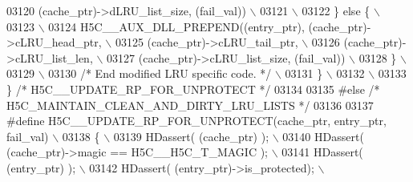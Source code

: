 \begin{DoxyCode}
03120 \textcolor{preprocessor}{                                 (cache\_ptr)->dLRU\_list\_size, (fail\_val))  \(\backslash\)}
03121 \textcolor{preprocessor}{                                                                           \(\backslash\)}
03122 \textcolor{preprocessor}{        \} else \{                                                           \(\backslash\)}
03123 \textcolor{preprocessor}{                                                                           \(\backslash\)}
03124 \textcolor{preprocessor}{            H5C\_\_AUX\_DLL\_PREPEND((entry\_ptr), (cache\_ptr)->cLRU\_head\_ptr,  \(\backslash\)}
03125 \textcolor{preprocessor}{                                 (cache\_ptr)->cLRU\_tail\_ptr,               \(\backslash\)}
03126 \textcolor{preprocessor}{                                 (cache\_ptr)->cLRU\_list\_len,               \(\backslash\)}
03127 \textcolor{preprocessor}{                                 (cache\_ptr)->cLRU\_list\_size, (fail\_val))  \(\backslash\)}
03128 \textcolor{preprocessor}{        \}                                                                  \(\backslash\)}
03129 \textcolor{preprocessor}{                                                                           \(\backslash\)}
03130 \textcolor{preprocessor}{        }\textcolor{comment}{/* End modified LRU specific code. */}\textcolor{preprocessor}{                              \(\backslash\)}
03131 \textcolor{preprocessor}{    \}                                                                      \(\backslash\)}
03132 \textcolor{preprocessor}{                                                                           \(\backslash\)}
03133 \textcolor{preprocessor}{\} }\textcolor{comment}{/* H5C\_\_UPDATE\_RP\_FOR\_UNPROTECT */}\textcolor{preprocessor}{}
03134 
03135 \textcolor{preprocessor}{#else }\textcolor{comment}{/* H5C\_MAINTAIN\_CLEAN\_AND\_DIRTY\_LRU\_LISTS */}\textcolor{preprocessor}{}
03136 
03137 \textcolor{preprocessor}{#define H5C\_\_UPDATE\_RP\_FOR\_UNPROTECT(cache\_ptr, entry\_ptr, fail\_val)       \(\backslash\)}
03138 \textcolor{preprocessor}{\{                                                                          \(\backslash\)}
03139 \textcolor{preprocessor}{    HDassert( (cache\_ptr) );                                               \(\backslash\)}
03140 \textcolor{preprocessor}{    HDassert( (cache\_ptr)->magic == H5C\_\_H5C\_T\_MAGIC );                    \(\backslash\)}
03141 \textcolor{preprocessor}{    HDassert( (entry\_ptr) );                                               \(\backslash\)}
03142 \textcolor{preprocessor}{    HDassert( (entry\_ptr)->is\_protected);                                  \(\backslash\)}

\end{DoxyCode}
